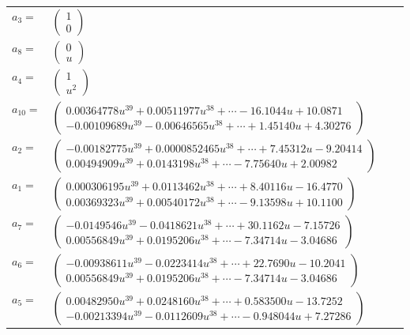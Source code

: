 \documentclass[1p]{elsarticle_modified}
\theoremstyle{definition}
\begin{document}
\begin{tabular}{m{7pt} m{180pt} m{7pt} m{180pt} }
\flushright $a_{3}=$&$\begin{pmatrix}1\\0\end{pmatrix}$ \\
\flushright $a_{8}=$&$\begin{pmatrix}0\\u\end{pmatrix}$ \\
\flushright $a_{4}=$&$\begin{pmatrix}1\\u^2\end{pmatrix}$ \\
\flushright $a_{10}=$&$\begin{pmatrix}0.00364778 u^{39}+0.00511977 u^{38}+\cdots-16.1044 u+10.0871\\-0.00109689 u^{39}-0.00646565 u^{38}+\cdots+1.45140 u+4.30276\end{pmatrix}$ \\
\flushright $a_{2}=$&$\begin{pmatrix}-0.00182775 u^{39}+0.0000852465 u^{38}+\cdots+7.45312 u-9.20414\\0.00494909 u^{39}+0.0143198 u^{38}+\cdots-7.75640 u+2.00982\end{pmatrix}$ \\
\flushright $a_{1}=$&$\begin{pmatrix}0.000306195 u^{39}+0.0113462 u^{38}+\cdots+8.40116 u-16.4770\\0.00369323 u^{39}+0.00540172 u^{38}+\cdots-9.13598 u+10.1100\end{pmatrix}$ \\
\flushright $a_{7}=$&$\begin{pmatrix}-0.0149546 u^{39}-0.0418621 u^{38}+\cdots+30.1162 u-7.15726\\0.00556849 u^{39}+0.0195206 u^{38}+\cdots-7.34714 u-3.04686\end{pmatrix}$ \\
\flushright $a_{6}=$&$\begin{pmatrix}-0.00938611 u^{39}-0.0223414 u^{38}+\cdots+22.7690 u-10.2041\\0.00556849 u^{39}+0.0195206 u^{38}+\cdots-7.34714 u-3.04686\end{pmatrix}$ \\
\flushright $a_{5}=$&$\begin{pmatrix}0.00482950 u^{39}+0.0248160 u^{38}+\cdots+0.583500 u-13.7252\\-0.00213394 u^{39}-0.0112609 u^{38}+\cdots-0.948044 u+7.27286\end{pmatrix}$ \\

\end{tabular}
\end{document}
